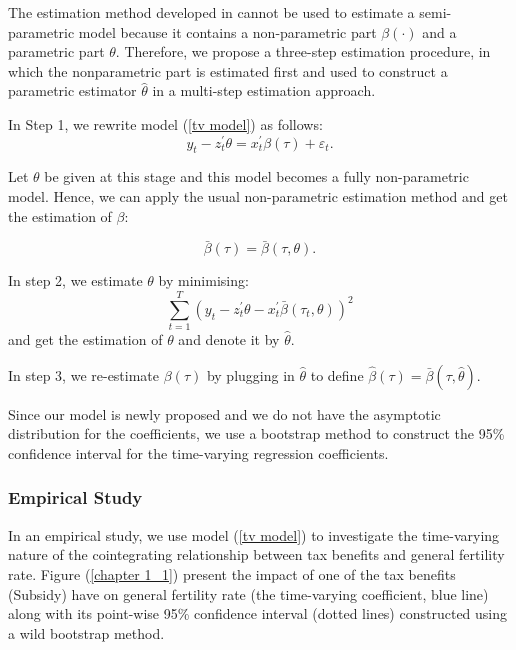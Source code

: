 \documentclass[a4paper,12pt,times,numbered,print,index]{report}
\numberwithin{equation}{section}
\begin{document}
The estimation method developed in \cite{phillips2017estimating} cannot be used to estimate a semi-parametric model because it contains a non-parametric part $\beta \left( \cdot \right) $ and a parametric part $\theta .$ Therefore, we propose a three-step estimation procedure, in which the nonparametric part is estimated first and used to construct a parametric estimator $\hat{\theta}$ in a multi-step estimation approach.

In Step 1, we rewrite model (\ref{tv model}) as follows:
\[
y_{t}-z_{t}^{\prime }\theta =x_{t}^{\prime }\beta \left( \tau \right) +\varepsilon _{t}. 
\]%

Let $\theta $ be given at this stage and this model becomes a fully non-parametric model. Hence, we can apply the usual non-parametric estimation method and get the estimation of $\beta$:

\[
\bar{\beta}\left( \tau \right) =\bar{\beta}\left( \tau ,\theta \right). 
\]

In step 2, we estimate $\theta $ by minimising:
\[
\sum_{t=1}^{T}\left( y_{t}-z_{t}^{\prime }\theta -x_{t}^{\prime }\bar{\beta}%
\left( \tau _{t},\theta \right) \right) ^{2} 
\]%
and get the estimation of $\theta$ and denote it by $\hat{\theta}$.

In step 3, we re-estimate $\beta \left( \tau \right) $ by plugging in $\widehat{\theta}$ to define $\widehat{\beta}\left( \tau \right) =\bar{\beta}\left( \tau ,\widehat{\theta}\right)$. 

Since our model is newly proposed and we do not have the asymptotic distribution for the coefficients, we use a bootstrap method to construct the 95\% confidence interval for the time-varying regression coefficients. 

\subsubsection*{Empirical Study}
In an empirical study, we use model (\ref{tv model}) to investigate the time-varying nature of the cointegrating relationship between tax benefits and general fertility rate. Figure (\ref{chapter 1_1}) present the impact of one of the tax benefits (Subsidy) have on general fertility rate (the time-varying coefficient, blue line) along with its point-wise 95\% confidence interval (dotted lines) constructed using a wild bootstrap method.
\end{document}
